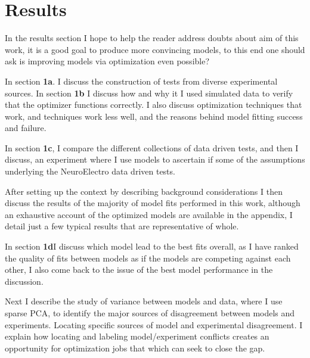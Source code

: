 \chapter{Results}
In the results section I hope to help the reader address doubts about aim of this work, it is a good goal to produce more convincing models, to this end one should ask is improving models via optimization even possible?

In section \textbf{1a}. I discuss the construction of tests from diverse experimental sources. In section \textbf{1b} I discuss how and why it I used simulated data to verify that the optimizer functions correctly. I also discuss optimization techniques that work, and techniques work less well, and the reasons behind model fitting success and failure. 

In section \textbf{1c}, I compare the different collections of data driven tests, and then I discuss, an experiment where I use models to ascertain if some of the assumptions underlying the NeuroElectro data driven tests. 

After setting up the context by describing background considerations I then discuss the results of the majority of model fits performed in this work, although an exhaustive account of the optimized models are available in the appendix, I detail just a few typical results that are representative of whole.

In section \textbf{1d}I discuss which model lead to the best fits overall, as I have ranked the quality of fits between models as if the models are competing against each other, I also come back to the issue of the best model performance in the discussion. %

Next I describe the study of variance between models and data, where I use sparse PCA, to identify the major sources of disagreement between models and experiments. Locating specific sources of model and experimental disagreement. I explain how locating and labeling model/experiment conflicts creates an opportunity for optimization jobs that which can seek to close the gap.



 


 







